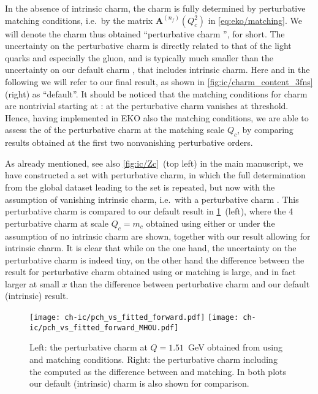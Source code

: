 
In the absence of intrinsic charm, the charm \pdf is fully determined by
perturbative matching conditions, i.e.\ by the matrix
$\mathbf{A}^{(n_f)}(Q_{c}^2)$ in \cref{eq:eko/matching}.
%
We will denote the
charm \pdf thus obtained
``perturbative charm \pdf'', for short. The \pdf
uncertainty on the perturbative charm \pdf is directly related to that 
of the light quarks and especially the gluon, and is typically much smaller
than  the  uncertainty on our default charm \pdf, that includes
intrinsic charm. Here and in the following we will refer to our final
result, as shown in \cref{fig:ic/charm_content_3fns} (right) as ``default''.
%
It should be noticed that the matching conditions for charm are 
nontrivial starting
at \nnlo: at \nlo the perturbative charm \pdf vanishes at threshold.
%
Hence, having implemented in EKO also the \nnnlo matching conditions,
we are able to assess the \mhou of the perturbative charm at the
matching scale $Q_c$, by comparing
results obtained at the first two nonvanishing perturbative
orders.

As already mentioned, see also \cref{fig:ic/Zc}~(top left) in the main manuscript, we have
constructed a \pdf set with perturbative charm, in which the full \pdf
determination from the global dataset leading to the  \pdf set
is repeated, but now with the assumption of vanishing intrinsic charm,
i.e.\ with a perturbative charm \pdf.
%
This perturbative charm \pdf is compared to our default result
in \cref{fig:ic/charm_fitted_vs_perturbative_mhous}~(left), where the 4\fns
perturbative 
charm \pdf at scale  $Q_c=m_c$ obtained using either \nnlo or \nnnlo
under the assumption of no intrinsic charm are shown, together with
our  result allowing for intrinsic charm.
%
It is clear that while on the one hand, the \pdf uncertainty on the
perturbative charm \pdf is indeed tiny, on the other
hand the difference between the result for perturbative charm
obtained using \nnlo or \nnnlo matching is large, and in
fact larger at small $x$ than the difference between perturbative charm and our
default (intrinsic) result.

\begin{figure}[h]
  \begin{center}
    \texttt{[image: ch-ic/pch\_vs\_fitted\_forward.pdf]}
    \texttt{[image: ch-ic/pch\_vs\_fitted\_forward\_MHOU.pdf]}
    \caption{\small Left: the perturbative charm \pdf at $Q=1.51$~GeV
  obtained from \nnlo \pdfs using \nnlo and \nnnlo matching
    conditions.
      Right: the \nnlo perturbative charm \pdf including the \mhou
    computed as the difference between \nnlo and \nnnlo matching.
In both plots our default (intrinsic) charm \pdf is also shown for comparison.  
  \label{fig:ic/charm_fitted_vs_perturbative_mhous} }
\end{center}
\end{figure}


